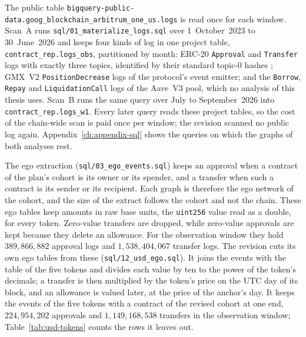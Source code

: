 The public table \texttt{bigquery-public-data.goog\_blockchain\_arbitrum\_one\_us.logs} is read once for each window. Scan~A runs \texttt{sql/01\_materialize\_logs.sql} over 1~October~2023 to 30~June~2026 and keeps four kinds of log in one project table, \texttt{contract\_rep.logs\_obs}, partitioned by month: ERC-20 \texttt{Approval} and \texttt{Transfer} logs with exactly three topics, identified by their standard topic-0 hashes \parencite{vogelsteller2015erc20}; GMX~V2 \texttt{PositionDecrease} logs of the protocol's event emitter; and the \texttt{Borrow}, \texttt{Repay} and \texttt{LiquidationCall} logs of the Aave~V3 pool, which no analysis of this thesis uses. Scan~B runs the same query over July to September~2026 into \texttt{contract\_rep.logs\_w1}. Every later query reads these project tables, so the cost of the chain-wide scan is paid once per window; the revision scanned no public log again. Appendix~\ref{ch:appendix-sql} shows the queries on which the graphs of both analyses rest.

The ego extraction (\texttt{sql/03\_ego\_events.sql}) keeps an approval when a contract of the plan's cohort is its owner or its spender, and a transfer when such a contract is its sender or its recipient. Each graph is therefore the ego network of the cohort, and the size of the extract follows the cohort and not the chain. These ego tables keep amounts in raw base units, the \texttt{uint256} value read as a double, for every token. Zero-value transfers are dropped, while zero-value approvals are kept because they delete an allowance. For the observation window they hold $389{,}866{,}882$ approval logs and $1{,}538{,}404{,}067$ transfer logs. The revision cuts its own ego tables from these (\texttt{sql/12\_usd\_ego.sql}). It joins the events with the table of the five tokens and divides each value by ten to the power of the token's decimals; a transfer is then multiplied by the token's price on the UTC day of its block, and an allowance is valued later, at the price of the anchor's day. It keeps the events of the five tokens with a contract of the revised cohort at one end, $224{,}954{,}202$ approvals and $1{,}149{,}168{,}538$ transfers in the observation window; Table~\ref{tab:usd-tokens} counts the rows it leaves out.

